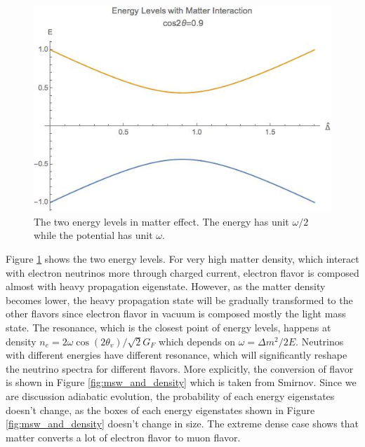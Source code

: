 \begin{figure}
\centering
\includegraphics[width=\columnwidth]{chapters/assets/solar/mswEnergyLevels.jpg}
\caption{The two energy levels in matter effect. The energy has unit $\omega/2$ while the potential has unit $\omega$.}
\label{fig:mswEnergyLevels}
\end{figure}

Figure \ref{fig:mswEnergyLevels} shows the two energy levels. For very high matter density, which interact with electron neutrinos more through charged current, electron flavor is composed almost with heavy propagation eigenstate. However, as the matter density becomes lower, the heavy propagation state will be gradually transformed to the other flavors since electron flavor in vacuum is composed mostly the light mass state. The resonance, which is the closest point of energy levels, happens at density $n_e　 = 2\omega \cos(2\theta_v)/\sqrt{2}G_F$ which depends on $\omega = \Delta m^2/2E$. Neutrinos with different energies have different resonance, which will significantly reshape the neutrino spectra for different flavors. More explicitly, the conversion of flavor is shown in
Figure \ref{fig:msw_and_density} which is taken from Smirnov.\cite{Smirnov2003} Since we are discussion adiabatic evolution, the probability of each energy eigenstates doesn't change, as the boxes of each energy eigenstates shown in Figure \ref{fig:msw_and_density} doesn't change in size. The extreme dense case shows that matter converts a lot of electron flavor to muon flavor.

